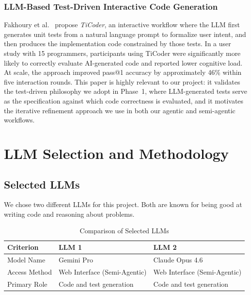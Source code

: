 \documentclass[12pt, a4paper]{article}
\begin{document}
\subsubsection{LLM-Based Test-Driven Interactive Code Generation}
Fakhoury et al.~\cite{ticoder} propose \textit{TiCoder}, an interactive workflow where the LLM first generates unit tests from a natural language prompt to formalize user intent, and then produces the implementation code constrained by those tests. In a user study with 15 programmers, participants using TiCoder were significantly more likely to correctly evaluate AI-generated code and reported lower cognitive load. At scale, the approach improved pass@1 accuracy by approximately 46\% within five interaction rounds. This paper is highly relevant to our project: it validates the test-driven philosophy we adopt in Phase~1, where LLM-generated tests serve as the specification against which code correctness is evaluated, and it motivates the iterative refinement approach we use in both our agentic and semi-agentic workflows.

\section{LLM Selection and Methodology}
\label{sec:methodology}

\subsection{Selected LLMs}
We chose two different LLMs for this project. Both are known for being good at writing code and reasoning about problems.

\begin{table}[H]
\centering
\caption{Comparison of Selected LLMs}
\label{tab:llm-comparison}
\begin{tabularx}{\textwidth}{l X X}
\toprule
\textbf{Criterion} & \textbf{LLM 1} & \textbf{LLM 2} \\
\midrule
Model Name       & Gemini Pro & Claude Opus 4.6 \\
Access Method    & Web Interface (Semi-Agentic) & Web Interface (Semi-Agentic) \\
Primary Role     & Code and test generation & Code and test generation \\
\bottomrule
\end{tabularx}
\end{table}
\end{document}
